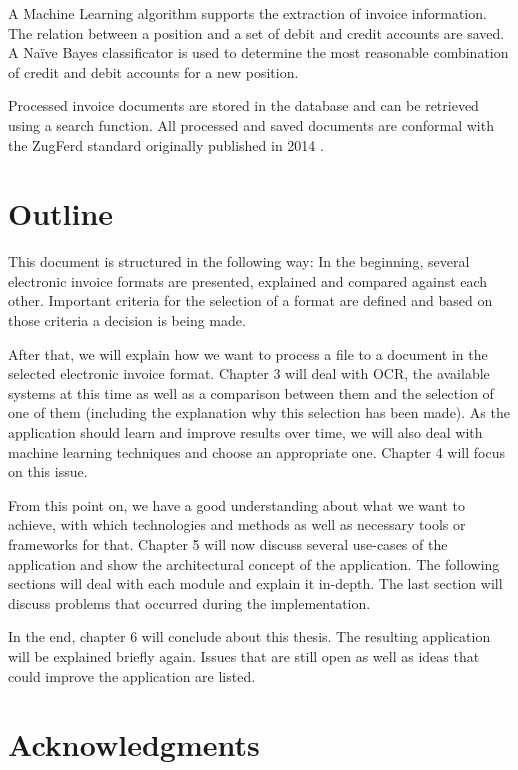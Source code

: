 A Machine Learning algorithm supports the extraction of invoice information. The relation between a position and a set of debit and credit accounts are saved. A Na{\"i}ve Bayes classificator is used to determine the most reasonable combination of credit and debit accounts for a new position.

Processed invoice documents are stored in the database and can be retrieved using a search function. All processed and saved documents are conformal with the ZugFerd standard originally published in 2014 \cite{Ferd14}.

\section{Outline}
\label{sec1.6}

This document is structured in the following way: In the beginning, several electronic invoice formats are presented, explained and compared against each other. Important criteria for the selection of a format are defined and based on those criteria a decision is being made.

After that, we will explain how we want to process a file to a document in the selected electronic invoice format. Chapter 3 will deal with OCR, the available systems at this time as well as a comparison between them and the selection of one of them (including the explanation why this selection has been made).
As the application should learn and improve results over time, we will also deal with machine learning techniques and choose an appropriate one. Chapter 4 will focus on this issue.

From this point on, we have a good understanding about what we want to achieve, with which technologies and methods as well as necessary tools or frameworks for that. Chapter 5 will now discuss several use-cases of the application and show the architectural concept of the application. The following sections will deal with each module and explain it in-depth. The last section will discuss problems that occurred during the implementation.


In the end, chapter 6 will conclude about this thesis. The resulting application will be explained briefly again. Issues that are still open as well as ideas that could improve the application are listed.

\section{Acknowledgments}
\label{sec1.7}

